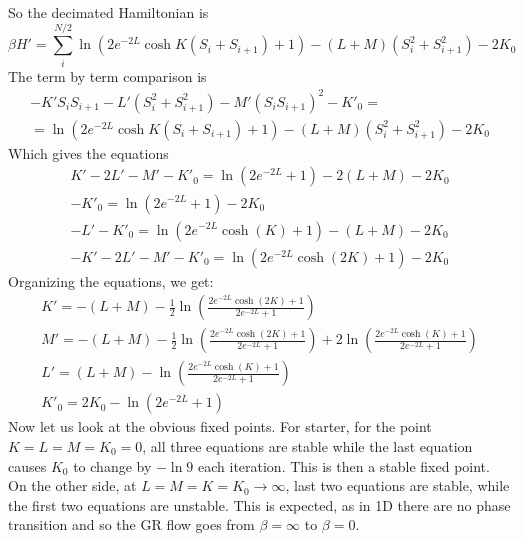 \documentclass{article}
\begin{document}
So the decimated Hamiltonian is
\begin{equation}
    \beta H' = \sum_i^{N/2} \ln\left(
            2e^{-2L}\cosh K(S_i + S_{i+1}) + 1
        \right) - (L + M)(S_i^2 + S_{i+1}^2) - 2K_0
\end{equation}
The term by term comparison is
\begin{equation}
\begin{gathered}
    -K' S_i S_{i+1}
    -L' \left(S_i^2 + S_{i+1}^2\right)
    -M' \left(S_i S_{i+1}\right)^2
    -K'_0 = \\ =
    \ln\left(
        2e^{-2L}\cosh K(S_i + S_{i+1}) + 1
    \right) - (L + M)(S_i^2 + S_{i+1}^2) - 2K_0
\end{gathered}
\end{equation}
Which gives the equations
\begin{equation}
\begin{gathered}
    K' - 2L' - M' - K'_0 = \ln(2e^{-2L} + 1) - 2(L + M) - 2K_0
    \\
    -K'_0 = \ln(2e^{-2L} + 1) - 2K_0
    \\
    -L' -K'_0 = \ln(2e^{-2L}\cosh(K) + 1) - (L + M) - 2K_0
    \\
    -K' - 2L' - M' - K'_0 = \ln(2e^{-2L}\cosh(2K) + 1) - 2K_0
\end{gathered}
\end{equation}
Organizing the equations, we get:
\begin{equation}
\begin{gathered}
    K' = - (L + M) - \frac{1}{2}\ln(\frac{2e^{-2L}\cosh(2K) + 1}{2e^{-2L} + 1})
    \\
    M' = - (L + M) - \frac{1}{2}\ln(\frac{2e^{-2L}\cosh(2K) + 1}{2e^{-2L} + 1}) + 2\ln(\frac{2e^{-2L}\cosh(K) + 1}{2e^{-2L} + 1})
    \\
    L' = (L + M) - \ln(\frac{2e^{-2L}\cosh(K) + 1}{2e^{-2L} + 1})
    \\
    K'_0 = 2K_0 - \ln(2e^{-2L} + 1)
\end{gathered}
\end{equation}
Now let us look at the obvious fixed points. For starter, for the point $K = L = M = K_0 = 0$, all three equations are stable while the last equation causes $K_0$ to change by $-\ln 9$ each iteration. This is then a stable fixed point. On the other side, at $L = M = K = K_0 \rightarrow \infty$, last two equations are stable, while the first two equations are unstable. This is expected, as in 1D there are no phase transition and so the GR flow goes from $\beta = \infty$ to $\beta = 0$.
\end{document}

